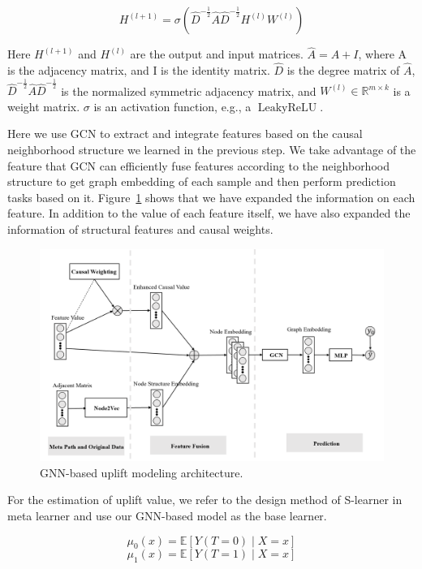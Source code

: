 \documentclass[sigconf,screen]{acmart}
\begin{document}
\begin{equation}
    H^{(l+1)}=\sigma\left(\hat{D}^{-\frac{1}{2}} \hat{A} \hat{D}^{-\frac{1}{2}} H^{(l)} W^{(l)}\right)
\end{equation}

Here $H^{(l+1)}$ and $H^{(l)}$ are the output and input matrices. $\hat{A}=A + I$, where A is the adjacency matrix, and I is the identity matrix. $\hat{D}$ is the degree matrix of $\hat{A}$, $\hat{D}^{-\frac{1}{2}} \hat{A} \hat{D}^{-\frac{1}{2}}$   is the normalized symmetric adjacency matrix, and  $W^{(l)} \in \mathbb{R}^{m \times k}$  is a weight matrix. $\sigma$  is an activation function, e.g., a  $\operatorname{LeakyReLU}$.

Here we use GCN to extract and integrate features based on the causal neighborhood structure we learned in the previous step. We take advantage of the feature that GCN can efficiently fuse features according to the neighborhood structure to get graph embedding of each sample and then perform prediction tasks based on it. Figure~\ref{uplift_GNN} shows that we have expanded the information on each feature. In addition to the value of each feature itself, we have also expanded the information of structural features and causal weights.

\begin{figure}[h]
  \centering
  \includegraphics[width=\linewidth]{Fig/GNN_uplift_modeling.png}
  \caption{GNN-based uplift modeling architecture.}
  \label{uplift_GNN}
\end{figure}

For the estimation of uplift value, we refer to the design method of S-learner in meta learner and use our GNN-based model as the base learner. 

\begin{equation}
     \mu_{0}(x)=\mathbb{E}[Y(T=0) \mid X=x]
\end{equation}
\begin{equation}
     \mu_{1}(x)=\mathbb{E}[Y(T=1) \mid X=x] 
\end{equation}
\end{document}
